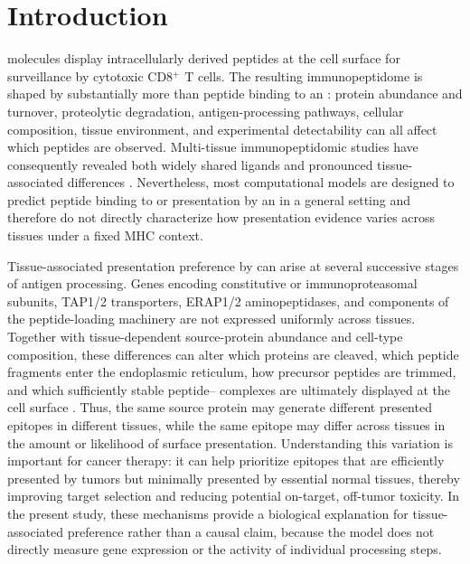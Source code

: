 \section{Introduction}

\plainMHCI{} molecules display intracellularly derived peptides at the cell surface for surveillance by cytotoxic CD8\(^{+}\) T cells. The resulting immunopeptidome is shaped by substantially more than peptide binding to an \plainMHC{}: protein abundance and turnover, proteolytic degradation, antigen-processing pathways, cellular composition, tissue environment, and experimental detectability can all affect which peptides are observed. Multi-tissue immunopeptidomic studies have consequently revealed both widely shared ligands and pronounced tissue-associated differences \cite{marcu2021atlas,schuster2018mouse}. Nevertheless, most computational models are designed to predict peptide binding to or presentation by an \plainMHC{} in a general setting and therefore do not directly characterize how presentation evidence varies across tissues under a fixed MHC context.

Tissue-associated presentation preference by \plainMHCI{} can arise at several successive stages of antigen processing. Genes encoding constitutive or immunoproteasomal subunits, TAP1/2 transporters, ERAP1/2 aminopeptidases, and components of the peptide-loading machinery are not expressed uniformly across tissues. Together with tissue-dependent source-protein abundance and cell-type composition, these differences can alter which proteins are cleaved, which peptide fragments enter the endoplasmic reticulum, how precursor peptides are trimmed, and which sufficiently stable peptide--\plainMHCI{} complexes are ultimately displayed at the cell surface \cite{kubiniok2022constitutive}. Thus, the same source protein may generate different presented epitopes in different tissues, while the same epitope may differ across tissues in the amount or likelihood of surface presentation. Understanding this variation is important for cancer therapy: it can help prioritize epitopes that are efficiently presented by tumors but minimally presented by essential normal tissues, thereby improving target selection and reducing potential on-target, off-tumor toxicity. In the present study, these mechanisms provide a biological explanation for tissue-associated preference rather than a causal claim, because the model does not directly measure gene expression or the activity of individual processing steps.

